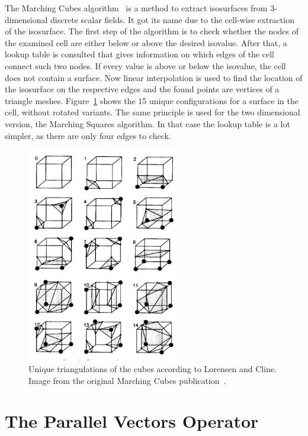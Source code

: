 The Marching Cubes algorithm~\cite{MC} is a method to extract
isosurfaces from 3-dimensional discrete scalar fields. It got its name
due to the cell-wise extraction of the isosurface. The first step of the
algorithm is to check whether the nodes of the examined cell are either
below or above the desired isovalue. After that, a lookup table is
consulted that gives information on which edges of the cell connect such
two nodes. If every value is above or below the isovalue, the cell does
not contain a surface. Now linear interpolation is used to find the
location of the isosurface on the respective edges and the found points
are vertices of a triangle meshes. Figure~\ref{fig:MCTable} shows the
15 unique configurations for a surface in the cell, without
rotated variants. The same principle is used for the two dimensional
version, the Marching Squares algorithm. In that case the lookup table
is a lot simpler, as there are only four edges to check.

\begin{figure}
  \centering
  \includegraphics[width=0.6\textwidth]{Images/MCTable.pdf}
  \caption{Unique triangulations of the cubes according to Lorensen and
  Cline. Image from the original Marching Cubes publication~\cite{MC}.}
  \label{fig:MCTable}
\end{figure}

\section{The Parallel Vectors Operator}

